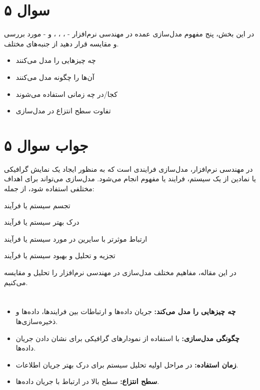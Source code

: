 \section*{سوال ۵}

در این بخش، پنج مفهوم مدل‌سازی عمده در مهندسی نرم‌افزار -
،
،
،
و
- مورد بررسی و مقایسه قرار دهید از جنبه‌های مختلف.

\begin{itemize}
	\item چه چیزهایی را مدل می‌کنند
	\item آن‌ها را چگونه مدل می‌کنند
	\item کجا/در چه زمانی استفاده می‌شوند
	\item تفاوت سطح انتزاع در مدل‌سازی
\end{itemize}

\section*{جواب سوال ۵}

در مهندسی نرم‌افزار، مدل‌سازی فرایندی است که به منظور ایجاد یک نمایش گرافیکی یا نمادین از یک سیستم، فرایند یا مفهوم انجام می‌شود. مدل‌سازی می‌تواند برای اهداف مختلفی استفاده شود، از جمله:

تجسم سیستم یا فرآیند

درک بهتر سیستم یا فرآیند

ارتباط موثرتر با سایرین در مورد سیستم یا فرآیند

تجزیه و تحلیل و بهبود سیستم یا فرآیند

در این مقاله، مفاهیم مختلف مدل‌سازی در مهندسی نرم‌افزار را تحلیل و مقایسه می‌کنیم.

\section*{}
\begin{itemize}
	\item \textbf{چه چیزهایی را مدل می‌کند:} جریان داده‌ها و ارتباطات بین فرایندها، داده‌ها و ذخیره‌سازی‌ها.
	\item \textbf{چگونگی مدل‌سازی:} با استفاده از نمودارهای گرافیکی برای نشان دادن جریان داده‌ها.
	\item \textbf{زمان استفاده:} در مراحل اولیه تحلیل سیستم برای درک بهتر جریان اطلاعات.
	\item \textbf{سطح انتزاع:} سطح بالا در ارتباط با جریان داده‌ها.
\end{itemize}

